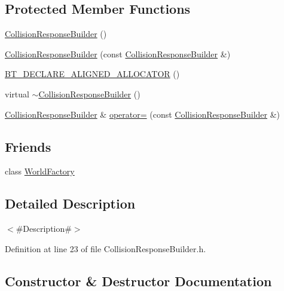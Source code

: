 \subsection*{Protected Member Functions}
\begin{DoxyCompactItemize}
\item 
\mbox{\hyperlink{classnjli_1_1_collision_response_builder_ac53d07488e9fa7b52e3d980adb5a018e}{Collision\+Response\+Builder}} ()
\item 
\mbox{\hyperlink{classnjli_1_1_collision_response_builder_a228e7cc1ea19bd71bb9bc3805620f1d1}{Collision\+Response\+Builder}} (const \mbox{\hyperlink{classnjli_1_1_collision_response_builder}{Collision\+Response\+Builder}} \&)
\item 
\mbox{\hyperlink{classnjli_1_1_collision_response_builder_a3a3a7ee2fceef8d94926d2e041f87819}{B\+T\+\_\+\+D\+E\+C\+L\+A\+R\+E\+\_\+\+A\+L\+I\+G\+N\+E\+D\+\_\+\+A\+L\+L\+O\+C\+A\+T\+OR}} ()
\item 
virtual \mbox{\hyperlink{classnjli_1_1_collision_response_builder_ad97734b5ae92854348b8d4aac8e0992a}{$\sim$\+Collision\+Response\+Builder}} ()
\item 
\mbox{\hyperlink{classnjli_1_1_collision_response_builder}{Collision\+Response\+Builder}} \& \mbox{\hyperlink{classnjli_1_1_collision_response_builder_a8560ccb4c41c8ac2fa96000f458634a2}{operator=}} (const \mbox{\hyperlink{classnjli_1_1_collision_response_builder}{Collision\+Response\+Builder}} \&)
\end{DoxyCompactItemize}
\subsection*{Friends}
\begin{DoxyCompactItemize}
\item 
class \mbox{\hyperlink{classnjli_1_1_collision_response_builder_acb96ebb09abe8f2a37a915a842babfac}{World\+Factory}}
\end{DoxyCompactItemize}


\subsection{Detailed Description}
$<$\#\+Description\#$>$ 

Definition at line 23 of file Collision\+Response\+Builder.\+h.



\subsection{Constructor \& Destructor Documentation}
\mbox{\label{classnjli_1_1_collision_response_builder_ac53d07488e9fa7b52e3d980adb5a018e}} 
